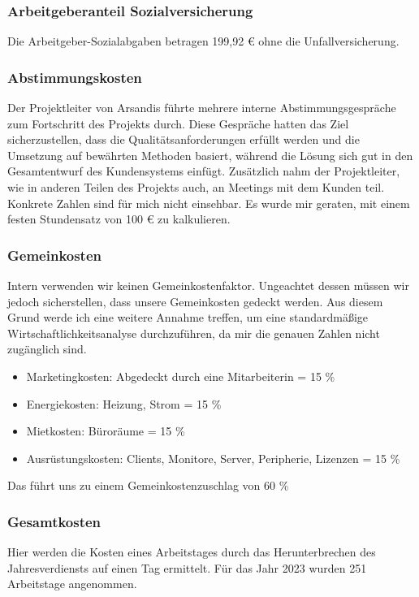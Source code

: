 \subsubsection*{Arbeitgeberanteil Sozialversicherung}
Die Arbeitgeber-Sozialabgaben betragen 199,92 € ohne die Unfallversicherung.

\subsubsection*{Abstimmungskosten}
Der Projektleiter von Arsandis führte mehrere interne Abstimmungsgespräche zum Fortschritt des Projekts durch.
Diese Gespräche hatten das Ziel sicherzustellen, dass die Qualitätsanforderungen erfüllt werden und die Umsetzung auf bewährten Methoden basiert, während die Lösung sich gut in den Gesamtentwurf des Kundensystems einfügt.
Zusätzlich nahm der Projektleiter, wie in anderen Teilen des Projekts auch, an Meetings mit dem Kunden teil. Konkrete Zahlen sind für mich nicht einsehbar.
Es wurde mir geraten, mit einem festen Stundensatz von 100 € zu kalkulieren.

\subsubsection*{Gemeinkosten}
Intern verwenden wir keinen Gemeinkostenfaktor.
Ungeachtet dessen müssen wir jedoch sicherstellen, dass unsere Gemeinkosten gedeckt werden.
Aus diesem Grund werde ich eine weitere Annahme treffen, um eine standardmäßige Wirtschaftlichkeitsanalyse durchzuführen, da mir die genauen Zahlen nicht zugänglich sind.
\begin{itemize}
	\item Marketingkosten: Abgedeckt durch eine Mitarbeiterin = 15 \%
	\item Energiekosten: Heizung, Strom = 15 \%
	\item Mietkosten: Büroräume = 15 \%
	\item Ausrüstungskosten: Clients, Monitore, Server, Peripherie, Lizenzen = 15 \%
\end{itemize}

Das führt uns zu einem Gemeinkostenzuschlag von 60 \%

\subsubsection*{Gesamtkosten}
Hier werden die Kosten eines Arbeitstages durch das Herunterbrechen des Jahresverdiensts auf einen Tag ermittelt.
Für das Jahr 2023 wurden 251 Arbeitstage angenommen.

